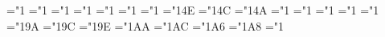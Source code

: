 { \mathchardef\bmbigwedge="1
 \mathchardef\bmbiguplus="1
 \mathchardef\bmbigcap="1
 \mathchardef\bmbigcup="1
 \mathchardef\bmintop="1 \def\bmint{\bmintop\nolimits}%
 \mathchardef\bmprod="1
 \mathchardef\bmsum="1
 \mathchardef\bmbigotimes="1\mtbex@@4E
 \mathchardef\bmbigoplus="1\mtbex@@4C
 \mathchardef\bmbigodot="1\mtbex@@4A
 \mathchardef\bmointop="1 \def\bmoint{\ointop\nolimits}%
 \mathchardef\bmiintop="1 \def\bmiint{\bmiintop\nolimits}%
 \mathchardef\bmiiintop="1 \def\bmiiint{\bmiiintop\nolimits}%
 \mathchardef\bmoiintop="1 \def\bmoiint{\bmoiintop\nolimits}%
 \mathchardef\bmoiiintop="1 \def\bmoiiint{\bmoiiintop\nolimits}%
 \mathchardef\bmcwointop="1\mtbex@@9A \def\bmcwoint{\bmcwointop\nolimits}%
 \mathchardef\bmawointop="1\mtbex@@9C \def\bmawoint{\bmawointop\nolimits}%
 \mathchardef\bmcwintop="1\mtbex@@9E \def\bmcwint{\bmcwintop\nolimits}%
 \mathchardef\bmbarintop="1\mtbex@@ AA   \def\bmbarint{\bmbarintop\nolimits}%
 \mathchardef\bmslashintop="1\mtbex@@ AC \def\bmslashint{\bmslashintop\nolimits}%
 \mathchardef\bmbigvarland="1\mtbex@@ A6
 \mathchardef\bmbigast="1\mtbex@@ A8
 \mathchardef\bmbigsqcup="1
 \def\bmlmoustache{\delimiter"4\mtbex@@7A\mtbex@@40 }%
 \def\bmrmoustahce{\delimiter"5\mtbex@@7B\mtbex@@41 }%
 \def\bmlgroup{\delimiter"4\mtbmi@@2E\mtbex@@3A }%
 \def\bmrgroup{\delimiter"5\mtbmi@@2F\mtbex@@3B }%
 \def\bmbracevert{\delimiter"\mtbex@@3E\mtbex@@3E }%
 \def\bmchoose{\atopwithdelims\bmlparens\bmrparens}%
 \def\bmbrack{\atopwithdelims\bmlbrack\bmrbrack}%
 \def\bmbrace{\atopwithdelims\bmlbrace\bmrbrace}%
}

\def\boldmath{%
 \textfont\z@\the\textfont\bffam
 \scriptfont\z@\the\scriptfont\bffam
 \scriptscriptfont\z@\the\scriptscriptfont\bffam
 \textfont\@ne\the\textfont\mtbmi@
 \scriptfont\@ne\the\scriptfont\mtbmi@
 \scriptscriptfont\@ne\the\scriptscriptfont\mtbmi@
 \textfont\tw@\the\textfont\mtbsy@
 \scriptfont\tw@\the\scriptfont\mtbsy@
 \scriptscriptfont\tw@\the\scriptscriptfont\mtbsy@
 \textfont\thr@@\the\textfont\mtbex@
 \scriptfont\thr@@\the\scriptfont\mtbex@
 \scriptscriptfont\thr@@\the\scriptscriptfont\mtbex@
 \ifx\p@renwd\undefined@
  \else
  \setbox\z@\hbox{\the\textfont\mtbex@ B}\p@renwd\wd\z@
 \fi
 \ifx\amstexloaded@\relax
  \buffer@\fontdimen13\the\textfont\mtbex@
  \buffer\buffer@
 \fi
 \let\lmoustache\bmlmoustache %
 \let\rmoustache\bmrmoustahce 
 \let\lgroup\bmlgroup
 \let\rgroup\bmrgroup
 \let\bracevert\bmbracevert
 \let\SQRT\sqrt
 \def\ROOT##1\OF##2{\root##1\of{##2}}%
 \def\PARENS##1{\left(##1\right)}%
 \def\LEFTRIGHT##1##2##3{\left##1##2\right##3}%
 \let\widehat\bmwidehat %
 \let\widetilde\bmwidetilde
 \let\widecheck\bmwidecheck}

